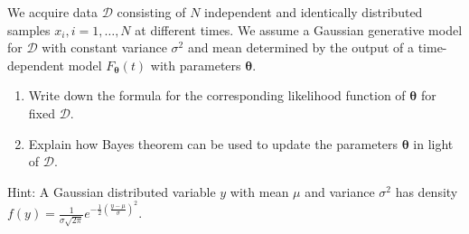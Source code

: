 \documentclass[11pt]{article}
\newcounter{marks}
\begin{document}
\begin{list}{{\bf Question :}}
\item
{}
\addtocounter{marks}{1}
We acquire data $\mathcal{D}$ consisting of $N$ independent and identically distributed samples $x_i, i = 1,\hdots,N$ at different times.
We assume a Gaussian generative model for $\mathcal{D}$ with constant variance $\sigma^2$ and mean determined by the output of a time-dependent model $F_{\boldsymbol{\theta}}(t)$ with parameters $\boldsymbol{\theta}$.
\vspace{-.2cm}
\begin{enumerate}
\item Write down the formula for the corresponding likelihood function of $\boldsymbol{\theta}$ for fixed $\mathcal{D}$.
\item Explain how Bayes theorem can be used to update the parameters $\boldsymbol{\theta}$ in light of $\mathcal{D}$.\\
\end{enumerate}
\vspace{-.6cm}
Hint: A Gaussian distributed variable $y$ with mean $\mu$ and variance $\sigma^2$ has density $f(y)=\frac{1}{\sigma\sqrt{2\pi}}e^{-\frac{1}{2}\left(\frac{y-\mu}{\sigma}\right)^2}.$

\framebox[16cm][l]{ 
\parbox{15.9cm}{
\vspace*{5cm}
}}


\end{list}
\end{document}
